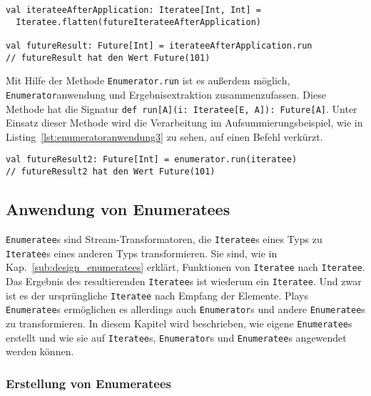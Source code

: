 \begin{lstlisting}[caption=Extrahierung des Ergebnisses aus einem Iteratee, label=lst:enumeratoranwendung2]
val iterateeAfterApplication: Iteratee[Int, Int] =
  Iteratee.flatten(futureIterateeAfterApplication)

val futureResult: Future[Int] = iterateeAfterApplication.run
// futureResult hat den Wert Future(101)
\end{lstlisting}

Mit Hilfe der Methode \lstinline|Enumerator.run| ist es außerdem möglich, \lstinline|Enumerator|anwendung und Ergebnisextraktion zusammenzufassen.
Diese Methode hat die Signatur \lstinline[breaklines=true]|def run[A](i: Iteratee[E, A]): Future[A]|.
Unter Einsatz dieser Methode wird die Verarbeitung im Aufsummierungsbeispiel, wie in Listing~\ref{lst:enumeratoranwendung3} zu sehen, auf einen Befehl verkürzt.

\begin{lstlisting}[caption=Anwendung eines Enumerators mit gleichzeitiger Ergebnisextrahierung, label=lst:enumeratoranwendung3]
val futureResult2: Future[Int] = enumerator.run(iteratee)
// futureResult2 hat den Wert Future(101)
\end{lstlisting}




\subsection{Anwendung von Enumeratees} %
\label{sub:enumeratees}

\lstinline|Enumeratee|s sind Stream-Transformatoren, die \lstinline|Iteratee|s eines Typs zu \lstinline|Iteratee|s eines anderen Typs transformieren.
Sie sind, wie in Kap.~\ref{sub:design_enumeratees} erklärt, Funktionen von \lstinline|Iteratee| nach \lstinline|Iteratee|.
Das Ergebnis des resultierenden \lstinline|Iteratee|s ist wiederum ein \lstinline|Iteratee|.
Und zwar ist es der ursprüngliche \lstinline|Iteratee| nach Empfang der Elemente.
Plays \lstinline|Enumeratee|s ermöglichen es allerdings auch \lstinline|Enumerator|s und andere \lstinline|Enumeratee|s zu transformieren.
In diesem Kapitel wird beschrieben, wie eigene \lstinline|Enumeratee|s erstellt und wie sie auf \lstinline|Iteratee|s, \lstinline|Enumerator|s und \lstinline|Enumeratee|s angewendet werden können.

\subsubsection{Erstellung von Enumeratees} %
\label{ssub:erstellung_von_enumeratees}

